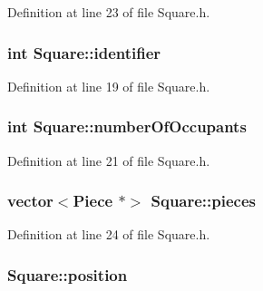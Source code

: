 Definition at line 23 of file Square.\-h.

\hypertarget{classSquare_a564b1f548b3be90a32c0dfd045de1187}{
\subsubsection[{identifier}]{\setlength{\rightskip}{0pt plus 5cm}int Square\-::identifier\hspace{0.3cm}{\ttfamily [protected]}}}\label{classSquare_a564b1f548b3be90a32c0dfd045de1187}


Definition at line 19 of file Square.\-h.

\hypertarget{classSquare_a61b6be58fcaec7b02aa82158cf9ac6fe}{
\subsubsection[{number\-Of\-Occupants}]{\setlength{\rightskip}{0pt plus 5cm}int Square\-::number\-Of\-Occupants\hspace{0.3cm}{\ttfamily [protected]}}}\label{classSquare_a61b6be58fcaec7b02aa82158cf9ac6fe}


Definition at line 21 of file Square.\-h.

\hypertarget{classSquare_a144124544a38dc3e81ff702191c1c627}{
\subsubsection[{pieces}]{\setlength{\rightskip}{0pt plus 5cm}vector$<${\bf Piece} $\ast$$>$ Square\-::pieces\hspace{0.3cm}{\ttfamily [protected]}}}\label{classSquare_a144124544a38dc3e81ff702191c1c627}


Definition at line 24 of file Square.\-h.

\hypertarget{classSquare_a08e99afd7be993cd1cbb50f4716e95ff}{
\subsubsection[{position}]{ Square\-::position\hspace{0.3cm}{\ttfamily [protected]}}}\label{classSquare_a08e99afd7be993cd1cbb50f4716e95ff}


